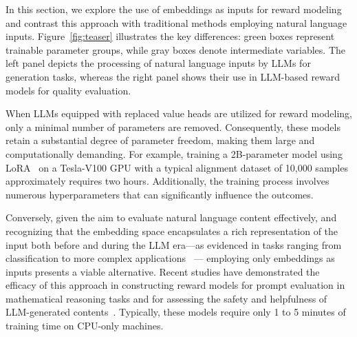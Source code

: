 

In this section, we explore the use of embeddings as inputs for reward modeling and contrast this approach with traditional methods employing natural language inputs. Figure~\ref{fig:teaser} illustrates the key differences: green boxes represent trainable parameter groups, while gray boxes denote intermediate variables. The left panel depicts the processing of natural language inputs by LLMs for generation tasks, whereas the right panel shows their use in LLM-based reward models for quality evaluation.

When LLMs equipped with replaced value heads are utilized for reward modeling, only a minimal number of parameters are removed. Consequently, these models retain a substantial degree of parameter freedom, making them large and computationally demanding. For example, training a 2B-parameter model using LoRA~\citep{hu2021lora} on a Tesla-V100 GPU with a typical alignment dataset of 10,000 samples approximately requires two hours. Additionally, the training process involves numerous hyperparameters that can significantly influence the outcomes.


Conversely, given the aim to evaluate natural language content effectively, and recognizing that the embedding space encapsulates a rich representation of the input both before and during the LLM era—as evidenced in tasks ranging from classification to more complex applications~\citep{mikolov2013efficient,pennington2014glove,devlin2018bert,kiros2015skip,cer2018universal,brown2020language} --- employing only embeddings as inputs presents a viable alternative. Recent studies have demonstrated the efficacy of this approach in constructing reward models for prompt evaluation in mathematical reasoning tasks and for assessing the safety and helpfulness of LLM-generated contents~\citep{sun2023query,sun2024rethinking}. Typically, these models require only 1 to 5 minutes of training time on CPU-only machines.

